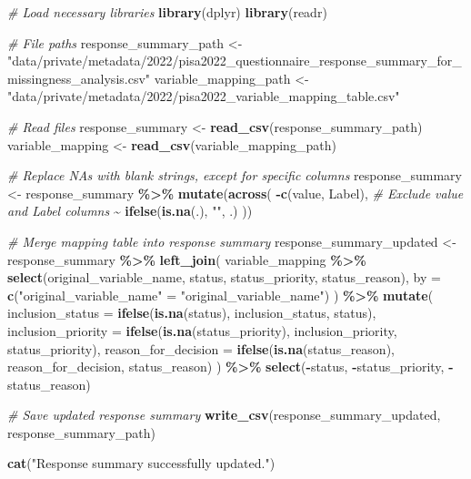 \documentclass[
]{article}
\newenvironment{Shaded}{\begin{snugshade}}{\end{snugshade}}
\newcommand{\AttributeTok}[1]{\textcolor[rgb]{0.13,0.29,0.53}{#1}}
\newcommand{\CommentTok}[1]{\textcolor[rgb]{0.56,0.35,0.01}{\textit{#1}}}
\newcommand{\FunctionTok}[1]{\textcolor[rgb]{0.13,0.29,0.53}{\textbf{#1}}}
\newcommand{\NormalTok}[1]{#1}
\newcommand{\OtherTok}[1]{\textcolor[rgb]{0.56,0.35,0.01}{#1}}
\newcommand{\SpecialCharTok}[1]{\textcolor[rgb]{0.81,0.36,0.00}{\textbf{#1}}}
\newcommand{\StringTok}[1]{\textcolor[rgb]{0.31,0.60,0.02}{#1}}
\begin{document}
\begin{Shaded}
\begin{Highlighting}[]
\CommentTok{\# Load necessary libraries}
\FunctionTok{library}\NormalTok{(dplyr)}
\FunctionTok{library}\NormalTok{(readr)}

\CommentTok{\# File paths}
\NormalTok{response\_summary\_path }\OtherTok{\textless{}{-}} \StringTok{"data/private/metadata/2022/pisa2022\_questionnaire\_response\_summary\_for\_missingness\_analysis.csv"}
\NormalTok{variable\_mapping\_path }\OtherTok{\textless{}{-}} \StringTok{"data/private/metadata/2022/pisa2022\_variable\_mapping\_table.csv"}

\CommentTok{\# Read files}
\NormalTok{response\_summary }\OtherTok{\textless{}{-}} \FunctionTok{read\_csv}\NormalTok{(response\_summary\_path)}
\NormalTok{variable\_mapping }\OtherTok{\textless{}{-}} \FunctionTok{read\_csv}\NormalTok{(variable\_mapping\_path)}

\CommentTok{\# Replace NAs with blank strings, except for specific columns}
\NormalTok{response\_summary }\OtherTok{\textless{}{-}}\NormalTok{ response\_summary }\SpecialCharTok{\%\textgreater{}\%}
  \FunctionTok{mutate}\NormalTok{(}\FunctionTok{across}\NormalTok{(}
    \SpecialCharTok{{-}}\FunctionTok{c}\NormalTok{(value, Label),  }\CommentTok{\# Exclude value and Label columns}
    \SpecialCharTok{\textasciitilde{}} \FunctionTok{ifelse}\NormalTok{(}\FunctionTok{is.na}\NormalTok{(.), }\StringTok{""}\NormalTok{, .)}
\NormalTok{  ))}

\CommentTok{\# Merge mapping table into response summary}
\NormalTok{response\_summary\_updated }\OtherTok{\textless{}{-}}\NormalTok{ response\_summary }\SpecialCharTok{\%\textgreater{}\%}
  \FunctionTok{left\_join}\NormalTok{(}
\NormalTok{    variable\_mapping }\SpecialCharTok{\%\textgreater{}\%}
      \FunctionTok{select}\NormalTok{(original\_variable\_name, status, status\_priority, status\_reason),}
    \AttributeTok{by =} \FunctionTok{c}\NormalTok{(}\StringTok{"original\_variable\_name"} \OtherTok{=} \StringTok{"original\_variable\_name"}\NormalTok{)}
\NormalTok{  ) }\SpecialCharTok{\%\textgreater{}\%}
  \FunctionTok{mutate}\NormalTok{(}
    \AttributeTok{inclusion\_status =} \FunctionTok{ifelse}\NormalTok{(}\FunctionTok{is.na}\NormalTok{(status), inclusion\_status, status),}
    \AttributeTok{inclusion\_priority =} \FunctionTok{ifelse}\NormalTok{(}\FunctionTok{is.na}\NormalTok{(status\_priority), inclusion\_priority, status\_priority),}
    \AttributeTok{reason\_for\_decision =} \FunctionTok{ifelse}\NormalTok{(}\FunctionTok{is.na}\NormalTok{(status\_reason), reason\_for\_decision, status\_reason)}
\NormalTok{  ) }\SpecialCharTok{\%\textgreater{}\%}
  \FunctionTok{select}\NormalTok{(}\SpecialCharTok{{-}}\NormalTok{status, }\SpecialCharTok{{-}}\NormalTok{status\_priority, }\SpecialCharTok{{-}}\NormalTok{status\_reason)}

\CommentTok{\# Save updated response summary}
\FunctionTok{write\_csv}\NormalTok{(response\_summary\_updated, response\_summary\_path)}

\FunctionTok{cat}\NormalTok{(}\StringTok{"Response summary successfully updated."}\NormalTok{)}
\end{Highlighting}
\end{Shaded}
\end{document}
